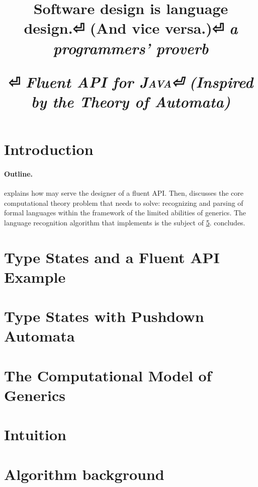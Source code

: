\documentclass[nonatbib,preprint,numbers]{sigplanconf}
\title{%
\begin{flushright}
  \scriptsize\bfseries
  Software design is language design.⏎
    (And vice versa.)⏎
  \footnotesize\mdseries\itshape
   a programmers' proverb
\end{flushright}
  \Huge \Fajita⏎
  \huge \itshape \textbf Fluent \textbf API for \textsc{\textbf Java}⏎
  \LARGE (\textbf Inspired by the \textbf Theory of \textbf Automata)
}
\begin{document}
\maketitle

\begin{abstract}
  
\end{abstract}

\section{Introduction}


\paragraph{Outline.}

  explains how \Fajita may serve the designer of a fluent API\@.
Then,  discusses 
  the core computational theory problem that \Fajita
  needs to solve: recognizing and parsing of formal languages
  within the framework of the limited abilities of \Java
  generics.
The language recognition algorithm that \Fajita
  implements is the subject of \cref{section:intuition}.
 concludes.

\section{Type States and a Fluent API Example}
\label{section:example}


\section{Type States with Pushdown Automata}
\label{section:generalization}


\section{The Computational Model of \protect\Java Generics}
\label{section:background}


\section{Intuition}
\label{section:intuition}


\section{Algorithm background}
\label{section:algorithm}

\end{document}
